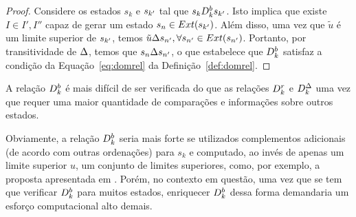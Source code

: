 \begin{proof}
  \noindent
      Considere os estados $s_k$ e $s_{{k'}}$ tal que $s_k D_k^{b} s_{{k'}}$.
      Isto implica que existe $I \in {I', I''}$ capaz de gerar um estado $s_n \in Ext(s_{{k'}})$.
      Além disso, uma vez que $\tilde{u}$ é um limite superior de $s_{{k'}}$,
      temos $\tilde{u} \Delta s_{{n'}}, \forall s_{{n'}} \in Ext(s_{{n'}})$.
      Portanto, por transitividade de $\Delta$, temos que $s_n \Delta s_{{n'}}$,
      o que estabelece que $D_k^{b}$ satisfaz a condição da Equação~\ref{eq:domrel}
      da Definição~\ref{def:domrel}.
\end{proof}
A relação $D_k^{b}$ é mais difícil de ser verificada do que as relações
$D_k^r$ e $D_k^{\Delta}$ uma vez que requer uma maior quantidade de
comparações e informações sobre outros estados.

Obviamente, a relação $D_k^{b}$ seria mais forte se utilizados complementos
adicionais (de acordo com outras ordenações) para $s_k$ e computado,
ao invés de apenas um limite superior $u$, um conjunto de limites superiores,
como, por exemplo, a proposta apresentada em \cite{ehrgott2007bound}.
Porém, no contexto em questão, uma vez que se tem que verificar $D_k^{b}$
para muitos estados, enriquecer $D_k^{b}$ dessa forma demandaria um
esforço computacional alto demais.


